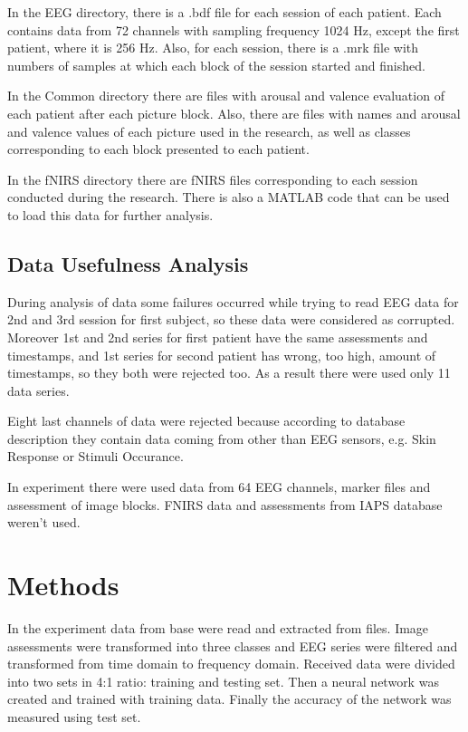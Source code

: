 \documentclass[10pt,journal,compsoc]{IEEEtran}
\begin{document}
In the EEG directory, there is a .bdf file for each session of each patient. Each contains data from 72 channels with sampling frequency 1024 Hz, except the first patient, where it is 256 Hz. Also, for each session, there is a .mrk file with numbers of samples at which each block of the session started and finished.

In the Common directory there are files with arousal and valence evaluation of each patient after each picture block. Also, there are files with names and arousal and valence values of each picture used in the research, as well as classes corresponding to each block presented to each patient.

In the fNIRS directory there are fNIRS files corresponding to each session conducted during the research. There is also a MATLAB code that can be used to load this data for further analysis.

\subsection{Data Usefulness Analysis}
During analysis of data some failures occurred while trying to read EEG data for 2nd and 3rd session for first subject, so these data were considered as corrupted. Moreover 1st and 2nd series for first patient have the same assessments and timestamps, and 1st series for second patient has wrong, too high, amount of timestamps, so they both were rejected too. As a result there were used only 11 data series.

Eight last channels of data were rejected because according to database description they contain data coming from other than EEG sensors, e.g. Skin Response or Stimuli Occurance.

In experiment there were used data from 64 EEG channels, marker files and assessment of image blocks. FNIRS data and assessments from IAPS database weren't used.


\section{Methods}
In the experiment data from base were read and extracted from files. Image assessments were transformed into three classes and EEG series were filtered and transformed from time domain to frequency domain. Received data were divided into two sets in 4:1 ratio: training and testing set. Then a neural network was created and trained with training data. Finally the accuracy of the network was measured using test set.
\end{document}
